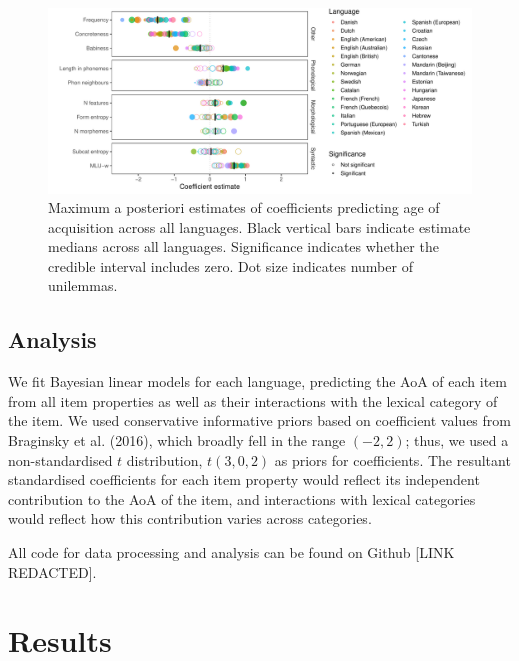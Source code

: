 \documentclass[10pt, letterpaper]{article}
\newenvironment{CodeChunk}{}{}
\begin{document}
\begin{CodeChunk}
\begin{figure}[ht]

{\centering \includegraphics[width=500px]{figs/big_plot-1} 

}

\caption[Maximum a posteriori estimates of coefficients predicting age of acquisition across all languages]{Maximum a posteriori estimates of coefficients predicting age of acquisition across all languages. Black vertical bars indicate estimate medians across all languages. Significance indicates whether the credible interval includes zero. Dot size indicates number of unilemmas.}\label{fig:big_plot}
\end{figure}
\end{CodeChunk}

\hypertarget{analysis}{%
\subsection{Analysis}\label{analysis}}

We fit Bayesian linear models for each language, predicting the AoA of
each item from all item properties as well as their interactions with
the lexical category of the item. We used conservative informative
priors based on coefficient values from Braginsky et al. (2016), which
broadly fell in the range \((-2, 2)\); thus, we used a non-standardised
\(t\) distribution, \(t(3, 0, 2)\) as priors for coefficients. The
resultant standardised coefficients for each item property would reflect
its independent contribution to the AoA of the item, and interactions
with lexical categories would reflect how this contribution varies
across categories.

All code for data processing and analysis can be found on Github {[}LINK
REDACTED{]}.

\hypertarget{results}{%
\section{Results}\label{results}}
\end{document}
